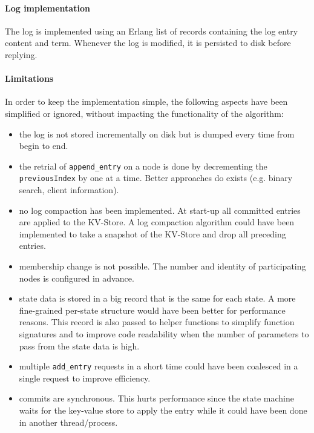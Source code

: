 \documentclass[a4paper]{article}
\begin{document}
\paragraph{Log implementation}
The log is implemented using an Erlang list of records containing the log 
entry content and term. Whenever the log is modified, it is persisted to disk 
before replying.

\paragraph{Limitations}
In order to keep the implementation simple, the following aspects have been
simplified or ignored, without impacting the functionality of the algorithm:
\begin{itemize}
    \item the log is not stored incrementally on disk but is dumped every time 
        from begin to end.
    \item the retrial of \texttt{append\_entry} on a node is done by 
        decrementing the \texttt{previousIndex} by one at a time. Better 
        approaches do exists (e.g. binary search, client information).
    \item no log compaction has been implemented. At start-up all committed 
        entries are applied to the KV-Store. A log compaction algorithm could 
        have been implemented to take a snapshot of the KV-Store and drop all 
        preceding entries.
    \item membership change is not possible. The number and identity of 
        participating nodes is configured in advance.
    \item state data is stored in a big record that is the same for each 
        state. A more fine-grained per-state structure would have been better
        for performance reasons. This record is also passed to helper functions 
        to simplify function signatures and to improve code readability
        when the number of parameters to pass from the state data is high.
    \item multiple \texttt{add\_entry} requests in a short time could have 
        been coalesced in a single request to improve efficiency.
    \item commits are synchronous. This hurts performance since the state 
        machine waits for the key-value store to apply the entry while it 
        could have been done in another thread/process.
\end{itemize}
\end{document}
